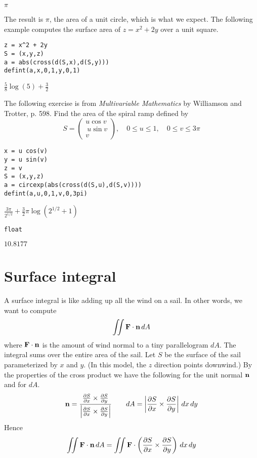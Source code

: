 \documentclass[12pt]{article}
\begin{document}
$\displaystyle \pi$

\bigskip
The result is $\pi$, the area of a unit circle, which is what we expect.
The following example computes the surface area of $z=x^2+2y$ over
a unit square.

{\color{blue}
\begin{verbatim}
z = x^2 + 2y
S = (x,y,z)
a = abs(cross(d(S,x),d(S,y)))
defint(a,x,0,1,y,0,1)
\end{verbatim}
}

$\displaystyle \tfrac{5}{8}\log(5)+\tfrac{3}{2}$

\bigskip
The following exercise is from
{\it Multivariable Mathematics} by Williamson and Trotter, p. 598.
Find the area of the spiral ramp defined by
\begin{equation*}
S=\begin{pmatrix}u\cos v\\\ u\sin v\\ v\end{pmatrix},\quad 0\le u\le1,\quad 0\le v\le3\pi
\end{equation*}

{\color{blue}
\begin{verbatim}
x = u cos(v)
y = u sin(v)
z = v
S = (x,y,z)
a = circexp(abs(cross(d(S,u),d(S,v))))
defint(a,u,0,1,v,0,3pi)
\end{verbatim}
}

$\displaystyle \frac{3\pi}{2^{1/2}}+\tfrac{3}{2}\pi\log\left(2^{1/2}+1\right)$

{\color{blue}
\begin{verbatim}
float
\end{verbatim}
}

$\displaystyle 10.8177$

\newpage

\section{Surface integral}

A surface integral is like adding up all the wind on a sail.
In other words, we want to compute
$$\int\!\!\!\int{\bf F\cdot n}\,dA$$
where ${\bf F\cdot n}$ is the amount of wind normal to a tiny parallelogram $dA$.
The integral sums over the entire area of the sail.
Let $S$ be the surface of the sail parameterized by $x$ and $y$.
(In this model, the $z$ direction points downwind.)
By the properties of the cross product we have the following for the unit normal $\bf n$
and for $dA$.
$${\bf n}=\frac{{\frac{\partial S}{\partial x}\times\frac{\partial S}{\partial y}}}
{{\left|\frac{\partial S}{\partial x}\times\frac{\partial S}{\partial y}\right|}}\qquad
dA=\left|\frac{\partial S}{\partial x}\times\frac{\partial S}{\partial y}\right|\,dx\,dy$$
Hence
$$\int\!\!\!\int{\bf F\cdot n}\,dA=\int\!\!\!\int{\bf F}\cdot
\left({\frac{\partial S}{\partial x}\times\frac{\partial S}{\partial y}}\right)\,dx\,dy$$
\end{document}
